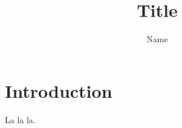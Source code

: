 \documentclass{article}
\title{Title}
\author{Name}
\begin{document}
\maketitle

\section{Introduction}

La la la.
\end{document}
